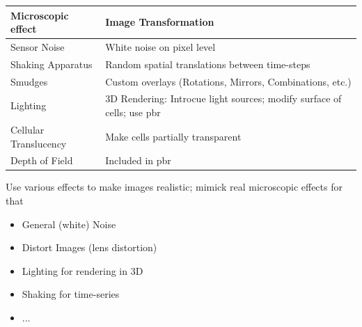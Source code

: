 \documentclass{article}
\begin{document}
\begin{table}[H]
    \begin{tabularx}{\textwidth}{l l}
        \toprule
        Microscopic effect & Image Transformation\\
        \midrule
        Sensor Noise & White noise on pixel level\\
        Shaking Apparatus & Random spatial translations between time-steps\\
        Smudges & Custom overlays (Rotations, Mirrors, Combinations, etc.)\\
        Lighting & 3D Rendering: Introcue light sources; modify surface of cells; use \ac{pbr}\\
        Cellular Translucency & Make cells partially transparent\\
        Depth of Field & Included in \ac{pbr}\\
        \bottomrule
    \end{tabularx}
    \label{tabular:microscopic-image-defects}
\end{table}

Use various effects to make images realistic; mimick real microscopic effects for that
\begin{itemize}
    \item General (white) Noise
    \item Distort Images (lens distortion)
    \item Lighting for rendering in 3D
    \item Shaking for time-series
    \item ...
\end{itemize}
\end{document}
